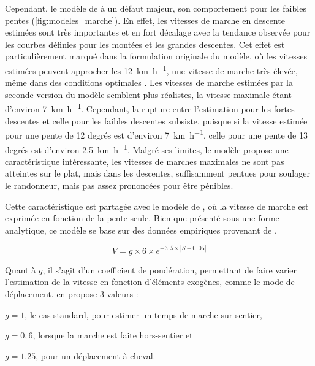 Cependant, le modèle de  à un défaut majeur,
son comportement pour les faibles pentes
(\autoref{fig:modeles_marche}). En effet, les vitesses de marche en
descente estimées sont très importantes et en fort décalage avec la
tendance observée pour les courbes définies pour les montées et les
grandes descentes. Cet effet est particulièrement marqué dans la
formulation originale du modèle, où les vitesses estimées peuvent
approcher les \SI{12}{\kilo\meter\per\hour}, une vitesse de marche
très élevée, même dans des conditions optimales
\autocite{Kerouanton2020}. Les vitesses de marche estimées par la
seconde version du modèle \autocite{Langmuir2013} semblent plus
réalistes, la vitesse maximale étant d'environ
\SI{7}{\kilo\meter\per\hour}. Cependant, la rupture entre l'estimation
pour les fortes descentes et celle pour les faibles descentes
subsiste, puisque si la vitesse estimée pour une pente de 12 degrés
est d'environ \SI{7}{\kilo\meter\per\hour}, celle pour une pente de 13
degrés est d'environ \SI{2,5}{\kilo\meter\per\hour}. Malgré ses
limites, le modèle  propose une caractéristique
intéressante, les vitesses de marches maximales ne sont pas atteintes
sur le plat, mais dans les descentes, suffisamment pentues pour
soulager le randonneur, mais pas assez prononcées pour être pénibles.

Cette caractéristique est partagée avec le modèle de
\textcite{Tobler1993}, où la vitesse de marche est exprimée en
fonction de la pente seule. Bien que présenté sous une forme
analytique, ce modèle se base sur des données empiriques provenant de
\textcite{Imhof1950} \autocite{Tobler1993}.

\begin{equation}
  \label{eq:marche_tobler}
  V = g × 6 × e^{-3,5 × \left| S + 0,05 \right|}
\end{equation}

Quant à \(g\), il s'agit d'un coefficient de
pondération, permettant de faire varier l'estimation de la vitesse en
fonction d'éléments exogènes, comme le mode de
déplacement. \textcite{Tobler1993} en propose 3 valeurs :
%
\begin{enumerate*}[label=(\alph*)]
\item \(g = 1\), le cas standard, pour estimer un temps de marche sur
  sentier,
\item \(g = 0,6\), lorsque la marche est faite hors-sentier et
\item  \(g = 1.25\), pour un déplacement à cheval.
\end{enumerate*}

